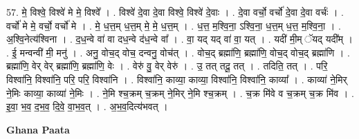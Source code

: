\documentclass[17pt]{extarticle}
\begin{document}
57. मे॒ विश्वे॒ विश्वे॑ मे मे॒ विश्वे᳚ । . विश्वे॑ दे॒वा दे॒वा विश्वे॒ विश्वे॑ दे॒वाः । . दे॒वा वर्चो॒ वर्चो॑ दे॒वा दे॒वा वर्चः॑ । . वर्चो॑ मे मे॒ वर्चो॒ वर्चो॑ मे । . मे॒ ध॒त्त॒म् ध॒त्त॒म् मे॒ मे॒ ध॒त्त॒म् । . ध॒त्त॒ म॒श्वि॒ना॒ ऽश्वि॒ना॒ ध॒त्त॒म् ध॒त्त॒ म॒श्वि॒ना॒ । . अ॒श्वि॒नेत्य॑श्विना । . द॒ध॒न्वे वा॑ वा दध॒न्वे द॑ध॒न्वे वा᳚ । . वा॒ यद् यद् वा॑ वा॒ यत् । . यदी॑ मी॒म् ॅयद् यदी᳚म् । . ई॒ मन्वन्वी॑ मी॒ मनु॑ । . अनु॒ वोच॒द् वोच॒ दन्वनु॒ वोच॑त् । . वोच॒द् ब्रह्मा॑णि॒ ब्रह्मा॑णि॒ वोच॒द् वोच॒द् ब्रह्मा॑णि । . ब्रह्मा॑णि॒ वेर् वेर् ब्रह्मा॑णि॒ ब्रह्मा॑णि॒ वेः । . वेरु॑ वु॒ वेर् वेरु॑ । . उ॒ तत् तदू॒ तत् । . तदिति॒ तत् । . परि॒ विश्वा॑नि॒ विश्वा॑नि॒ परि॒ परि॒ विश्वा॑नि । . विश्वा॑नि॒ काव्या॒ काव्या॒ विश्वा॑नि॒ विश्वा॑नि॒ काव्या᳚ । . काव्या॑ ने॒मिर् ने॒मिः काव्या॒ काव्या॑ ने॒मिः । . ने॒मि श्च॒क्रम् च॒क्रम् ने॒मिर् ने॒मि श्च॒क्रम् । . च॒क्र मि॑वे व च॒क्रम् च॒क्र मि॑व । . इ॒वा॒ भ॒व॒ द॒भ॒व॒ दि॒वे॒ वा॒भ॒व॒त् । . अ॒भ॒व॒दित्य॑भवत् । \newline

\textbf{Ghana Paata } \newline
\end{document}
